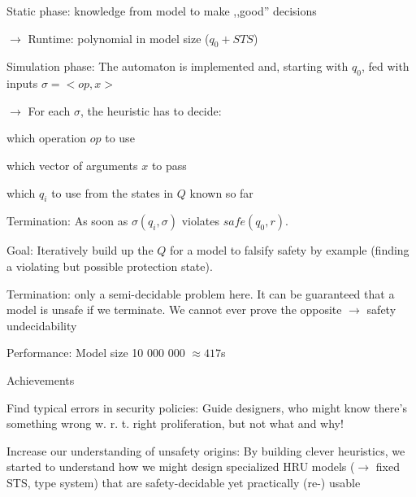 \documentclass[a4paper]{article}
\begin{document}
\begin{multicols}{3}
\begin{enumerate*}
        \item Static phase: knowledge from model to make ,,good'' decisions
        \begin{itemize*}
            \item[$\rightarrow$] Runtime: polynomial in model size ($q_0 + STS$)
        \end{itemize*}
        \item Simulation phase: The automaton is implemented and, starting with $q_0$, fed with inputs $\sigma=<op,x>$
        \begin{itemize*}
            \item[$\rightarrow$] For each $\sigma$, the heuristic has to decide:
            \item which operation $op$ to use
            \item which vector of arguments $x$ to pass
            \item which $q_i$ to use from the states in $Q$ known so far
            \item Termination: As soon as $\sigma(q_i,\sigma)$ violates $safe(q_0,r)$.
        \end{itemize*}
    \end{enumerate*}

    Goal: Iteratively build up the $Q$ for a model to falsify safety by example (finding a violating but possible protection state).

    \begin{itemize*}
        \item Termination: only a semi-decidable problem here. It can be guaranteed that a model is unsafe if we terminate. We cannot ever prove the opposite $\rightarrow$ safety undecidability
        \item Performance: Model size 10 000 000 $\approx 417$s
    \end{itemize*}

    Achievements
    \begin{itemize*}
        \item Find typical errors in security policies: Guide designers, who might know there’s something wrong w. r. t. right proliferation, but not what and why!
        \item Increase our understanding of unsafety origins: By building clever heuristics, we started to understand how we might design specialized HRU models ($\rightarrow$ fixed STS, type system) that are safety-decidable yet practically (re-) usable
    \end{itemize*}


\end{multicols}
\end{document}
